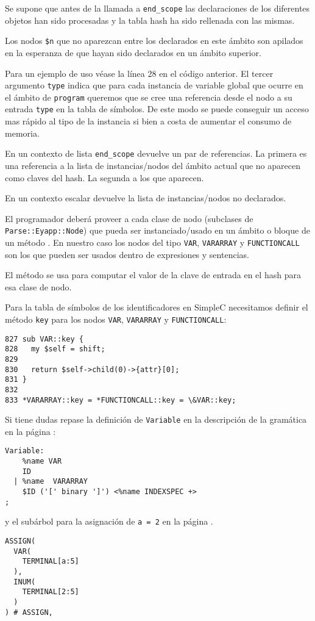 Se supone que antes de la llamada
a {\tt end\_scope} las declaraciones de los diferentes objetos
han sido procesadas
y la tabla hash ha sido rellenada con las mismas.

Los nodos \verb|$n| que no aparezcan entre los
declarados en este ámbito  son apilados en la esperanza de que 
hayan sido declarados en un ámbito superior.

Para un ejemplo de uso véase la línea 28 en el código anterior. 
El tercer argumento \verb|type| indica que para cada instancia
de variable global que ocurre en el ámbito de \verb|program|
queremos que se cree una referencia desde el nodo a su entrada
\verb|type| en la tabla de símbolos. De este modo se puede
conseguir un acceso mas rápido al tipo de la instancia si bien a costa
de aumentar el consumo de memoria.

En un contexto de lista \verb|end_scope| devuelve un par de referencias.
La primera es una referencia a la lista de instancias/nodos
del ámbito actual que no aparecen como claves
del hash. La segunda a los que aparecen. 

En un contexto escalar devuelve la lista de instancias/nodos 
no declarados.


El programador deberá proveer a cada clase de nodo (subclases de \verb|Parse::Eyapp::Node|)
que pueda ser instanciado/usado en un ámbito o bloque de un método . 
En nuestro caso los nodos 
del tipo \verb|VAR|, \verb|VARARRAY| y \verb|FUNCTIONCALL| son los que 
pueden
ser usados dentro de expresiones y sentencias.

El método  
se usa para computar el valor de la clave de 
entrada en el hash para esa clase de nodo.

Para la tabla de símbolos de los identificadores
en SimpleC necesitamos definir el método \verb|key| para los nodos \verb|VAR|,
\verb|VARARRAY| y \verb|FUNCTIONCALL|:

\begin{verbatim}
827 sub VAR::key {
828   my $self = shift;
829
830   return $self->child(0)->{attr}[0];
831 }
832
833 *VARARRAY::key = *FUNCTIONCALL::key = \&VAR::key;
\end{verbatim}

Si tiene dudas repase la definición de \verb|Variable|
en la descripción de la gramática en la página \pageref{parrafo:elcuerpo}:

\begin{verbatim}
Variable:
    %name VAR
    ID 
  | %name  VARARRAY
    $ID ('[' binary ']') <%name INDEXSPEC +> 
;
\end{verbatim}
y el subárbol para la asignación de \verb|a = 2| en la página \pageref{parrafo:ejemplodearbolconstruido}.
\begin{verbatim}
ASSIGN(
  VAR(
    TERMINAL[a:5]
  ),
  INUM(
    TERMINAL[2:5]
  )
) # ASSIGN,
\end{verbatim}

